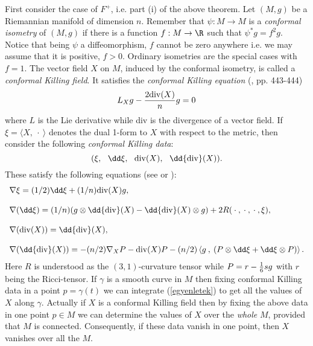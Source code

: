 \documentclass[a4paper,12pt,draft]{article}
\begin{document}
First consider the case of $F^+$, i.e. part (i) of the above theorem. Let 
$(M,g)$ be a Riemannian manifold of dimension $n$. Remember that $\psi
:M\rightarrow M$ is a {\it conformal isometry} of
$(M,g)$ if there is a function $f: M\rightarrow\R$ such that
$\psi^*g=f^2g$. Notice that being $\psi$ a diffeomorphism, $f$ cannot be
zero anywhere i.e. we may assume that it is positive, $f>0$. Ordinary
isometries are the special cases with $f=1$. The
vector field $X$ on $M$, induced by the conformal isometry, is
called a {\it conformal Killing field}. It satisfies the {\it conformal
Killing equation} (\cite{wal}, pp. 443-444) 
\[L_Xg-{2{\rm div}(X)\over n}g=0\]
where $L$ is the Lie derivative while div is the divergence of a
vector field. If $\xi =\langle X,\:\cdot\:\rangle$ denotes the dual 1-form
to $X$ with respect to the metric, then consider the following {\it
conformal Killing data}:
\begin{equation}
(\xi ,\:\:\:\dd\xi ,\:\:\:{\rm div}(X),\:\:\: \dd {\rm div}(X)).
\label{adatok}
\end{equation}
These satisfy the following equations (see \cite{gar} or \cite{ger}):
\begin{equation}
\begin{array}{ll}
\nabla\xi =(1/2)\dd\xi +(1/n){\rm div}(X)g,\\
\\
\nabla (\dd\xi )=(1/n)(g\otimes\dd {\rm div}(X) -\dd{\rm 
div}(X)\otimes g)+2R(\:\cdot\:,\:\cdot\:,\:\cdot\:,\xi ),\\
\\
\nabla ({\rm div}(X))=\dd{\rm div}(X),\\
\\
\nabla (\dd {\rm div}(X))=-(n/2)\nabla_XP-{\rm
div}(X)P-(n/2)\left\langle g\:,\: (P\otimes\dd\xi +\dd\xi\otimes
P)\right\rangle .\\
\end{array}
\label{egyenletek}
\end{equation}
Here $R$ is understood as the $(3,1)$-curvature tensor while $P=r-{1\over
6}sg$ with $r$ being the Ricci-tensor.
If $\gamma$ is a smooth curve in $M$ then fixing conformal Killing data in
a point $p=\gamma (t)$ we can integrate (\ref{egyenletek}) to get all the
values of $X$ along $\gamma$. Actually if $X$ is a conformal Killing field
then by fixing the above data in one point $p\in M$ we can determine the
values of $X$ over the {\it whole} $M$, provided that $M$ is connected. 
Consequently, if these data vanish in one point, then $X$ vanishes over
all the $M$. 
\end{document}
